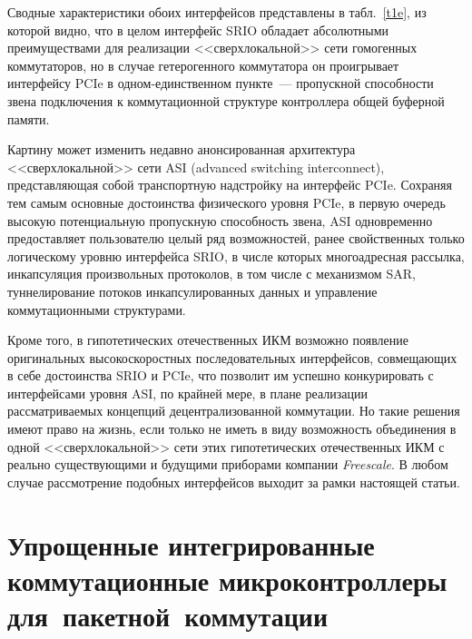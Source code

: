 \begin{multicols}{2}
     
     Сводные характеристики обоих интерфейсов представлены в табл.~\ref{t1e}, из которой видно, 
что в целом интерфейс SRIO обладает абсолютными преимуществами для реализации 
<<сверхлокальной>> сети гомогенных коммутаторов, но в случае гетерогенного 
коммутатора он проигрывает интерфейсу PCIe в одном-единственном пункте~--- 
пропускной способности звена подключения к коммутационной структуре контроллера 
общей буферной па\-мяти.
     

     Картину может изменить недавно анонсированная архитектура <<сверхлокальной>> 
сети ASI (advanced switching interconnect), представляющая собой транспортную надстройку 
на интерфейс PCIe. Сохраняя тем самым основные достоинства физического уровня PCIe, в 
первую очередь высокую потенциальную пропускную способность звена, ASI одновременно 
предоставляет пользователю целый ряд возможностей, ранее свойственных только 
логическому уровню интерфейса SRIO, в числе которых многоадресная рассылка, 
инкапсуляция произвольных протоколов, в том числе с механизмом SAR, туннелирование 
потоков инкапсулированных данных и управление коммутационными структурами.
     
     Кроме того, в гипотетических отечественных ИКМ возможно появление оригинальных 
высокоскоростных последовательных интерфейсов, совмещающих в себе достоинства SRIO 
и PCIe, что позволит им успешно конкурировать с интерфейсами уровня ASI, по крайней 
мере, в плане реализации рассматриваемых концепций децентрализованной коммутации. Но 
такие решения имеют право на жизнь, если только не иметь в виду возможность 
объединения в одной <<сверхлокальной>> сети этих гипотетических отечественных ИКМ с 
реально существующими и будущими приборами компании \textit{Freescale}. В любом 
случае рассмотрение подобных интерфейсов выходит за рамки настоящей статьи.

\section{Упрощенные интегрированные коммутационные микроконтроллеры для~пакетной~коммутации}

\begin{figure*} %
\vspace*{1pt}
\begin{center}
\mbox{%
\epsfxsize=141.78mm
}
\end{center}
\vspace*{-9pt}
\end{figure*}


\end{multicols}
